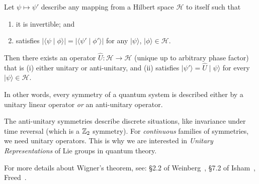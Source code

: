 \begin{theorem}[Wigner]\label{thm:wigner's-theorem}
Let $\psi\mapsto\psi'$ describe any mapping from a Hilbert space
$\mathcal{H}$ to itself such that
\begin{enumerate}
\item it is invertible; and
\item satisfies $|\langle\psi\mid\phi\rangle|=|\langle\psi'\mid\phi'\rangle|$
for any $|\psi\rangle$, $|\phi\rangle\in\mathcal{H}$.
\end{enumerate}
Then there exists an operator $\widehat{U}\colon\mathcal{H}\to\mathcal{H}$
(unique up to arbitrary phase factor) that is (i) either unitary or anti-unitary,
and (ii) satisfies $|\psi'\rangle = \widehat{U}\mid\psi\rangle$ for
every $|\psi\rangle\in\mathcal{H}$.
\end{theorem}

In other words, every symmetry of a quantum system is described either
by a unitary linear operator \emph{or} an anti-unitary operator.

\begin{remark}
The anti-unitary symmetries describe discrete situations, like
invariance under time reversal (which is a $\mathbb{Z}_{2}$ symmetry).
For \emph{continuous} families of symmetries, we need unitary
operators. This is why we are interested in \emph{Unitary Representations}
of Lie groups in quantum theory.
\end{remark}

\begin{remark}
For more details about Wigner's theorem, see:
\S2.2 of Weinberg~\cite{Weinberg:1995mt},
\S7.2 of Isham~\cite{Isham:1995lq},
Freed~\cite{Freed:2011aa}.
\end{remark}